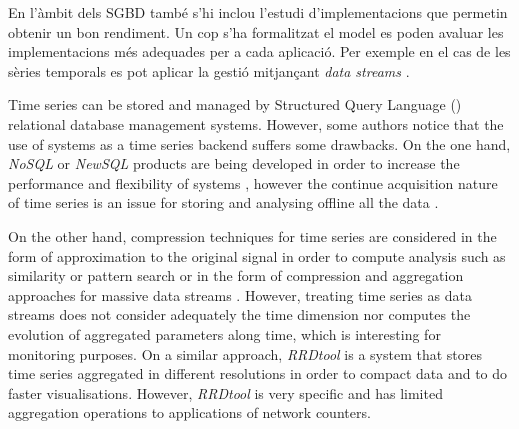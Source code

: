 En l'àmbit dels SGBD també s'hi inclou l'estudi d'implementacions que
permetin obtenir un bon rendiment. Un cop s'ha formalitzat el model es
poden avaluar les implementacions més adequades per a cada
aplicació. Per exemple en el cas de les sèries temporals es pot
aplicar la gestió mitjançant \emph{data
  streams} \parencite{babcock02}.



Time series can be stored and managed by Structured Query Language
() relational database management systems. However, some
authors \cite{dreyer94,schmidt95,stonebraker09:scidb,zhang11} notice
that the use of  systems as a time series backend suffers
some drawbacks.  On the one hand, \emph{NoSQL} or \emph{NewSQL}
products are being developed in order to increase the performance and
flexibility of  systems
\cite{atzeni13:relational_model_dead,stonebraker10,stonebraker09:scidb,zhang11},
however the continue acquisition nature of time series is an issue for
storing and analysing offline all the data \cite{keogh97}.


On the other hand, compression techniques for time series are
considered in the form of approximation to the original signal in
order to compute analysis such as similarity or pattern search
\cite{fu11,keogh01,last01} or in the form of compression and
aggregation approaches for massive data streams
\cite{cormode08:pods,bonnet01}. However, treating time series as data
streams does not consider adequately the time dimension nor computes
the evolution of aggregated parameters along time, which is
interesting for monitoring purposes.  On a similar approach,
\emph{RRDtool} \cite{rrdtool} is a system that stores time series
aggregated in different resolutions in order to compact data and to do
faster visualisations. However, \emph{RRDtool} is very specific and
has limited aggregation operations to applications of network
counters.





